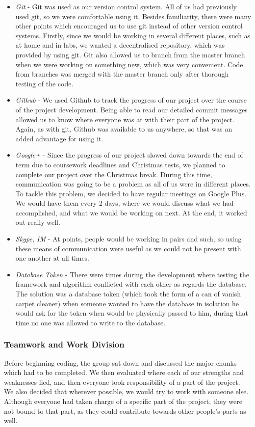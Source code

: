 \documentclass[11pt]{article}
\begin{document}
\begin{itemize}
\item 
\emph{Git} - Git was used as our version control system. All of us had previously
used git, so we were comfortable using it. Besides familiarity, there were
many other points which encouraged us to use git instead of other version control
systems. Firstly, since we would be working in several different places, such as
at home and in labs, we wanted a decentralised repository, which was provided
by using git. Git also allowed us to branch from the master branch when we were
working on something new, which was very convenient. Code from branches was
merged with the master branch only after thorough testing of the code.
\item 
\emph{Github} - We used Github to track the progress of our project over the course
of the project development. Being able to read our detailed commit messages
allowed us to know where everyone was at with their part of the project. Again,
as with git, Github was available to us anywhere, so that was an added advantage
for using it.
\item 
\emph{Google+} - Since the progress of our project slowed down towards the end
of term due to coursework deadlines and Christmas tests, we planned to complete
our project over the Christmas break. During this time, communication was going
to be a problem as all of us were in different places. To tackle this problem,
we decided to have regular meetings on Google Plus. We would have them every 2
days, where we would discuss what we had accomplished, and what we would be working
on next. At the end, it worked out really well.
\item 
\emph{Skype, IM} - At points, people would be working in pairs and such, so using
these means of communication were useful as we could not be present with one
another at all times.
\item
\emph{Database Token} - There were times during the development where testing the
framework and algorithm conflicted with each other as regards the database. The solution 
was a database token (which took the form of a can of vanish carpet cleaner) when someone
wanted to have the database in isolation he would ask for the token when would be physically
passed to him, during that time no one was allowed to write to the database.

\end{itemize}


\subsubsection{Teamwork and Work Division}
Before beginning coding, the group sat down and discussed the major chunks
which had to be completed. We then evaluated where each of our strengths
and weaknesses lied, and then everyone took responsibility of a part of the
project. We also decided that wherever possible, we would try to work with 
someone else. Although everyone had taken charge of a specific part of the
project, they were not bound to that part, as they could contribute towards
other people's parts as well.
\end{document}
